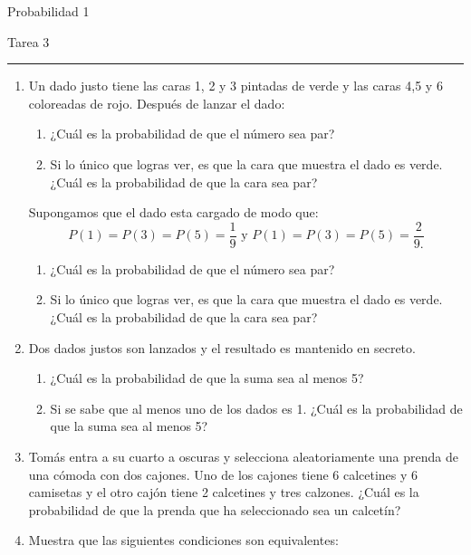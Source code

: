 \documentclass{report}
\begin{document}
\begin{center}
    \textsf{\Large Probabilidad 1}
    \par\medskip
    \textsf{\large Tarea 3}
    \end{center}
    \hrule
    \par\bigskip

\begin{enumerate}
    \item Un dado justo tiene las caras 1, 2 y 3 pintadas de verde y las caras 4,5 y 6 coloreadas de rojo. Después de lanzar el dado:
    \begin{enumerate}
        \item ¿Cuál es la probabilidad de que el número sea par?
        \item Si lo único que logras ver, es que la cara que muestra el dado es verde. ¿Cuál es la probabilidad de que la cara sea par?
    \end{enumerate}
    Supongamos que el dado esta cargado  de modo que:
    \begin{equation*}
        P(1)=P(3)=P(5)=\frac{1}{9} \text{ y } P(1)=P(3)=P(5)=\frac{2}{9.}
    \end{equation*}
    \begin{enumerate}
        \item ¿Cuál es la probabilidad de que el número sea par?
        \item Si lo único que logras ver, es que la cara que muestra el dado es verde. ¿Cuál es la probabilidad de que la cara sea par?
    \end{enumerate}
    \item Dos dados justos son lanzados y el resultado es mantenido en secreto. 
    \begin{enumerate}
        \item ¿Cuál es la probabilidad de que la suma sea al menos 5?
        \item Si se sabe que al menos uno de los dados es 1. ¿Cuál es la probabilidad de que la suma sea al menos 5?
    \end{enumerate}
    \item Tomás entra a su cuarto a oscuras y selecciona aleatoriamente una prenda de una cómoda con dos cajones. Uno de los cajones tiene 6 calcetines y 6 camisetas y el otro cajón tiene 2 calcetines y tres calzones. ¿Cuál es la probabilidad de que la prenda que ha seleccionado sea un calcetín?   
    \item Muestra que las siguientes condiciones son equivalentes:
    \begin{enumerate}

\end{enumerate}
\end{enumerate}
\end{document}
